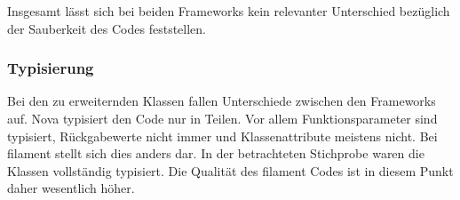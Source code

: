 Insgesamt lässt sich bei beiden Frameworks kein relevanter Unterschied bezüglich der Sauberkeit des Codes feststellen.

\newpage

\subsubsection{Typisierung}
Bei den zu erweiternden Klassen fallen Unterschiede zwischen den Frameworks auf.
Nova typisiert den Code nur in Teilen.
Vor allem Funktionsparameter sind typisiert, Rückgabewerte nicht immer und Klassenattribute meistens nicht.
Bei filament stellt sich dies anders dar.
In der betrachteten Stichprobe waren die Klassen vollständig typisiert.
Die Qualität des filament Codes ist in diesem Punkt daher wesentlich höher.
